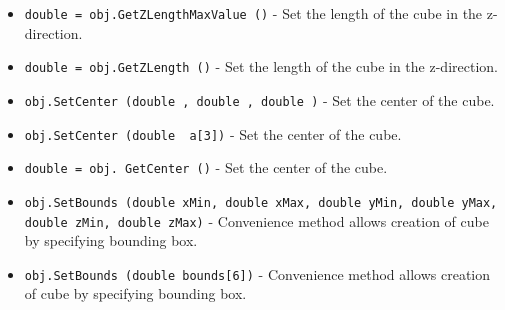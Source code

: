 \begin{itemize}
\item  \verb|double = obj.GetZLengthMaxValue ()| -  Set the length of the cube in the z-direction.

\item  \verb|double = obj.GetZLength ()| -  Set the length of the cube in the z-direction.

\item  \verb|obj.SetCenter (double , double , double )| -  Set the center of the cube.

\item  \verb|obj.SetCenter (double  a[3])| -  Set the center of the cube.

\item  \verb|double = obj. GetCenter ()| -  Set the center of the cube.

\item  \verb|obj.SetBounds (double xMin, double xMax, double yMin, double yMax, double zMin, double zMax)| -  Convenience method allows creation of cube by specifying bounding box.

\item  \verb|obj.SetBounds (double bounds[6])| -  Convenience method allows creation of cube by specifying bounding box.

\end{itemize}
